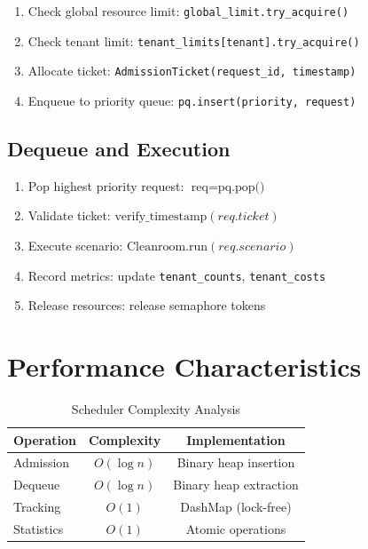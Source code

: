 \documentclass[12pt,twoside,openright]{book}
\theoremstyle{plain}
\theoremstyle{definition}
\theoremstyle{remark}
\begin{document}
\begin{algorithm}
\caption{Admission Control}
\begin{enumerate}
  \item Check global resource limit: \texttt{global\_limit.try\_acquire()}
  \item Check tenant limit: \texttt{tenant\_limits[tenant].try\_acquire()}
  \item Allocate ticket: \texttt{AdmissionTicket(request\_id, timestamp)}
  \item Enqueue to priority queue: \texttt{pq.insert(priority, request)}
\end{enumerate}
\end{algorithm}

\subsection{Dequeue and Execution}

\begin{algorithm}
\caption{Dequeue and Execution}
\begin{enumerate}
  \item Pop highest priority request: $\text{req} = \text{pq.pop()}$
  \item Validate ticket: $\text{verify\_timestamp}(req.ticket)$
  \item Execute scenario: $\text{Cleanroom.run}(req.scenario)$
  \item Record metrics: update \texttt{tenant\_counts}, \texttt{tenant\_costs}
  \item Release resources: release semaphore tokens
\end{enumerate}
\end{algorithm}

\section{Performance Characteristics}

\begin{table}[H]
\centering
\begin{tabular}{|l|c|c|}
\hline
\textbf{Operation} & \textbf{Complexity} & \textbf{Implementation} \\
\hline
Admission & $O(\log n)$ & Binary heap insertion \\
\hline
Dequeue & $O(\log n)$ & Binary heap extraction \\
\hline
Tracking & $O(1)$ & DashMap (lock-free) \\
\hline
Statistics & $O(1)$ & Atomic operations \\
\hline
\end{tabular}
\caption{Scheduler Complexity Analysis}
\label{tab:scheduler_complexity}
\end{table}
\end{document}
